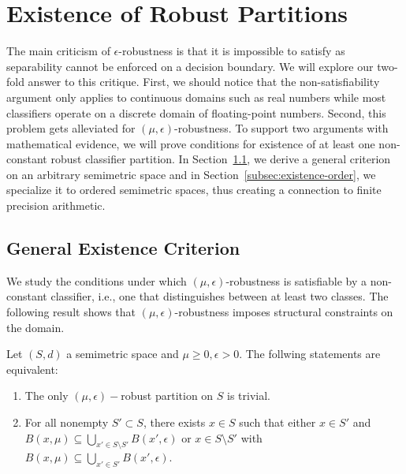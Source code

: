 \section{Existence of Robust Partitions}
\label{sec:existence}

The main criticism of $\epsilon$-robustness is that it is impossible to satisfy as separability cannot be enforced on a decision boundary. We will explore our two-fold answer to this critique. First, we should notice that the non-satisfiability argument only applies to continuous domains such as real numbers while most classifiers operate on a discrete domain of floating-point numbers. Second, this problem gets alleviated for $(\mu,\epsilon)$-robustness. To support two arguments with mathematical evidence, we will prove conditions for existence of at least one non-constant robust classifier partition. In Section~\ref{subsec:general-existence}, we derive a general criterion on an arbitrary semimetric space and in Section~\ref{subsec:existence-order}, we specialize it to ordered semimetric spaces, thus creating a connection to finite precision arithmetic.

\subsection{General Existence Criterion}
\label{subsec:general-existence}

We study the conditions under which $(\mu, \epsilon)$-robustness is satisfiable by a non-constant classifier, i.e., one that distinguishes between at least two classes. The following result shows that $(\mu, \epsilon)$-robustness imposes structural constraints on the domain.
\begin{theorem}
\label{thm:existence}
Let $(S,d)$ a semimetric space and $\mu \geq 0, \epsilon > 0$. The follwing statements are equivalent:
\begin{enumerate}
    \item The only $(\mu,\epsilon)-$robust partition on $S$ is trivial.
    \item For all nonempty $S' \subset S$, there exists $x \in S$ such that either $x \in S'$ and $B(x,\mu) \subseteq \bigcup_{x' \in S \setminus S'} B(x', \epsilon)$ or $x \in S \setminus S'$ with $B(x,\mu) \subseteq \bigcup_{x' \in S'} B(x', \epsilon)$.
\end{enumerate}
\end{theorem}

